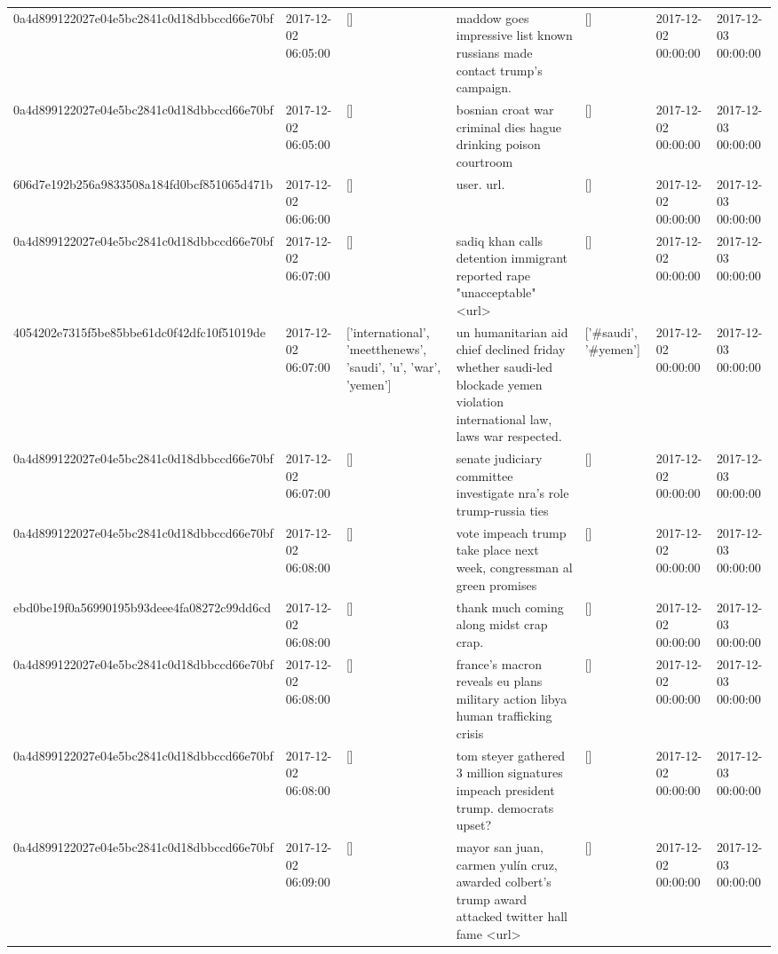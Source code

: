 \begin{tabular}{lllllll}
0a4d899122027e04e5bc2841c0d18dbbccd66e70bf & 2017-12-02 06:05:00 & [] & maddow goes impressive list known russians made contact trump's campaign. & [] & 2017-12-02 00:00:00 & 2017-12-03 00:00:00 \\
0a4d899122027e04e5bc2841c0d18dbbccd66e70bf & 2017-12-02 06:05:00 & [] & bosnian croat war criminal dies hague drinking poison courtroom & [] & 2017-12-02 00:00:00 & 2017-12-03 00:00:00 \\
606d7e192b256a9833508a184fd0bcf851065d471b & 2017-12-02 06:06:00 & [] & user. url. & [] & 2017-12-02 00:00:00 & 2017-12-03 00:00:00 \\
0a4d899122027e04e5bc2841c0d18dbbccd66e70bf & 2017-12-02 06:07:00 & [] & sadiq khan calls detention immigrant reported rape "unacceptable" <url> & [] & 2017-12-02 00:00:00 & 2017-12-03 00:00:00 \\
4054202e7315f5be85bbe61dc0f42dfc10f51019de & 2017-12-02 06:07:00 & ['international', 'meetthenews', 'saudi', 'u', 'war', 'yemen'] & un humanitarian aid chief declined friday whether saudi-led blockade yemen violation international law, laws war respected. & ['#saudi', '#yemen'] & 2017-12-02 00:00:00 & 2017-12-03 00:00:00 \\
0a4d899122027e04e5bc2841c0d18dbbccd66e70bf & 2017-12-02 06:07:00 & [] & senate judiciary committee investigate nra's role trump-russia ties & [] & 2017-12-02 00:00:00 & 2017-12-03 00:00:00 \\
0a4d899122027e04e5bc2841c0d18dbbccd66e70bf & 2017-12-02 06:08:00 & [] & vote impeach trump take place next week, congressman al green promises & [] & 2017-12-02 00:00:00 & 2017-12-03 00:00:00 \\
ebd0be19f0a56990195b93deee4fa08272c99dd6cd & 2017-12-02 06:08:00 & [] & thank much coming along midst crap crap. & [] & 2017-12-02 00:00:00 & 2017-12-03 00:00:00 \\
0a4d899122027e04e5bc2841c0d18dbbccd66e70bf & 2017-12-02 06:08:00 & [] & france's macron reveals eu plans military action libya human trafficking crisis & [] & 2017-12-02 00:00:00 & 2017-12-03 00:00:00 \\
0a4d899122027e04e5bc2841c0d18dbbccd66e70bf & 2017-12-02 06:08:00 & [] & tom steyer gathered 3 million signatures impeach president trump. democrats upset? & [] & 2017-12-02 00:00:00 & 2017-12-03 00:00:00 \\
0a4d899122027e04e5bc2841c0d18dbbccd66e70bf & 2017-12-02 06:09:00 & [] & mayor san juan, carmen yulín cruz, awarded colbert's trump award attacked twitter hall fame <url> & [] & 2017-12-02 00:00:00 & 2017-12-03 00:00:00 \\

\end{tabular}
